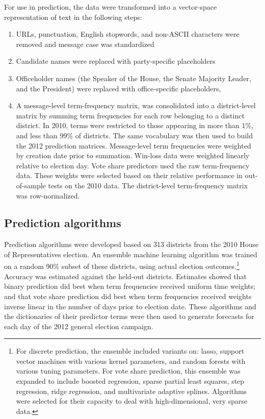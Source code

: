 \documentclass{acm_proc_article-sp}
\begin{document}
For use in prediction, the data were transformed into a vector-space
representation of text in the following steps:
\begin{enumerate}
\item URLs, punctuation, English stopwords, and non-ASCII characters were removed and
  message case was standardized
\item Candidate names were replaced with party-specific placeholders
\item Officeholder names (the Speaker of the House, the Senate
  Majority Leader, and the President) were replaced with
  office-specific placeholders,
\item A message-level term-frequency matrix,
  was consolidated into a district-level matrix by summing term
  frequencies for each row belonging to a distinct district. In 2010,
  terms were restricted to those appearing in more than 1\%, and less
  than 99\% of districts. The same vocabulary was then used to build
  the 2012 prediction matrices. Message-level term frequencies were
  weighted by creation date prior to summation. Win-loss data were
   weighted linearly relative to election
  day. Vote share 
  predictors used the raw term-frequency data. These weights were
  selected based on their relative performance in out-of-sample tests
  on the 2010 data. The district-level term-frequency matrix was row-normalized.
\end{enumerate}

\subsection{Prediction algorithms}
\label{sec:pred-algor}

Prediction algorithms were developed based on 313 districts from the 2010 House of
Representatives election. An ensemble machine learning
algorithm \cite{van2007super} was trained on a random 90\% subset of
these districts, using actual election outcomes.\footnote{For discrete
  prediction, the ensemble
included variants on: lasso, support vector machines with various
kernel parameters, and random forests with various tuning
parameters. For vote share prediction, this ensemble was expanded to
include boosted regression, sparse partial least squares, step
regression, ridge regression, and multivariate adaptive splines. Algorithms were selected for their capacity to deal with
high-dimensional, very sparse data.} Accuracy was
estimated against the held-out districts. Estimates showed that binary
prediction did best when term frequencies received uniform time
weights; and that vote share prediction did best when term frequencies
received weights inverse linear in the number of days prior to
election date. These algorithms and the dictionaries of their
predictor terms were then used to generate forecasts for each day of
the 2012 general election campaign.
\end{document}

